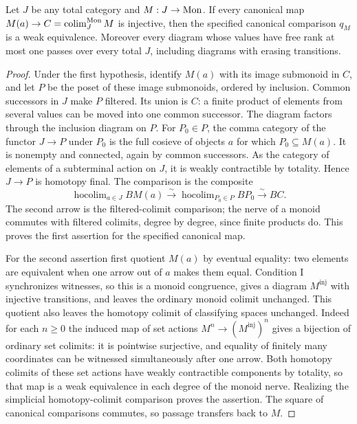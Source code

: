 \begin{proposition}
\label{G:generalcomparison}
Let $J$ be any total category and $M:J\to\mathrm{Mon}$.
If every canonical map
$M(a)\to C=\operatorname*{colim}_J^{\mathrm{Mon}}M$ is injective, then the specified
canonical comparison $q_M$ is a weak equivalence.
Moreover every diagram whose values have free rank at most
one passes over every total $J$, including diagrams with
erasing transitions.
\end{proposition}
\begin{proof}
Under the first hypothesis, identify $M(a)$ with its image
submonoid in $C$, and let $P$ be the poset of these image
submonoids, ordered by inclusion.  Common successors in $J$
make $P$ filtered.  Its union is $C$: a finite product of
elements from several values can be moved into one common
successor.  The diagram factors through the inclusion diagram
on $P$.  For $P_0\in P$, the comma category of the functor
$J\to P$ under $P_0$ is the full cosieve of objects $a$ for
which $P_0\subseteq M(a)$.  It is nonempty and connected,
again by common successors.  As the category of elements of
a subterminal action on $J$, it is weakly contractible by
totality.  Hence $J\to P$ is homotopy final.  The comparison
is the composite
\[
 \operatorname{hocolim}_{a\in J}BM(a)
 \xrightarrow{\sim}
 \operatorname{hocolim}_{P_0\in P}BP_0
 \xrightarrow{\sim} BC.
\]
The second arrow is the filtered-colimit comparison; the
nerve of a monoid commutes with filtered colimits, degree by
degree, since finite products do.  This proves the first
assertion for the specified canonical map.

For the second assertion first quotient $M(a)$ by eventual
equality: two elements are equivalent when one arrow out of
$a$ makes them equal.  Condition I synchronizes witnesses,
so this is a monoid congruence, gives a diagram $M^{\mathrm{inj}}$
with injective transitions, and leaves the ordinary monoid
colimit unchanged.  This quotient also leaves the homotopy
colimit of classifying spaces unchanged.  Indeed for each
$n\ge0$ the induced map of set actions
$M^n\to(M^{\mathrm{inj}})^n$ gives a bijection of ordinary
set colimits: it is pointwise surjective, and equality of
finitely many coordinates can be witnessed simultaneously
after one arrow.  Both homotopy colimits of these set actions
have weakly contractible components by totality, so that map
is a weak equivalence in each degree of the monoid nerve.
Realizing the simplicial homotopy-colimit comparison proves
the assertion.  The square of canonical comparisons commutes,
so passage transfers back to $M$.


\end{proof}
